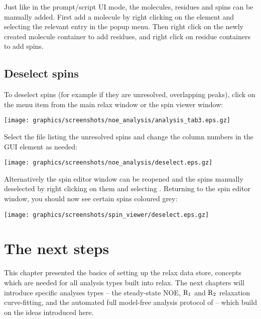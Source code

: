 Just like in the prompt/script UI mode, the molecules, residues and spins can be manually added.  First add a molecule by right clicking on the  element and selecting the relevant entry in the popup menu.  Then right click on the newly created molecule container to add residues, and right click on residue containers to add spins.



\subsection{Deselect spins} \label{sect: GUI - deselect spins}

To deselect spins (for example if they are unresolved, overlapping peaks), click on the  menu item from the main relax window or the spin viewer window:

\begin{minipage}[h]{\linewidth}
\centerline{\texttt{[image: graphics/screenshots/noe\_analysis/analysis\_tab3.eps.gz]}}
\end{minipage}

Select the file listing the unresolved spins and change the column numbers in the  GUI element as needed: 

\begin{minipage}[h]{\linewidth}
\centerline{\texttt{[image: graphics/screenshots/noe\_analysis/deselect.eps.gz]}}
\end{minipage}

Alternatively the spin editor window can be reopened and the spins manually deselected by right clicking on them and selecting .  Returning to the spin editor window, you should now see certain spins coloured grey:

\begin{minipage}[h]{\linewidth}
\centerline{\texttt{[image: graphics/screenshots/spin\_viewer/deselect.eps.gz]}}
\end{minipage}




\section{The next steps}

This chapter presented the basics of setting up the relax data store, concepts which are needed for all analysis types built into relax.  The next chapters will introduce specific analyses types -- the steady-state NOE, $\mathrm{R}_1$ and $\mathrm{R}_2$ relaxation curve-fitting, and the automated full model-free analysis protocol of \citet{dAuvergneGooley07,dAuvergneGooley08b} -- which build on the ideas introduced here.
